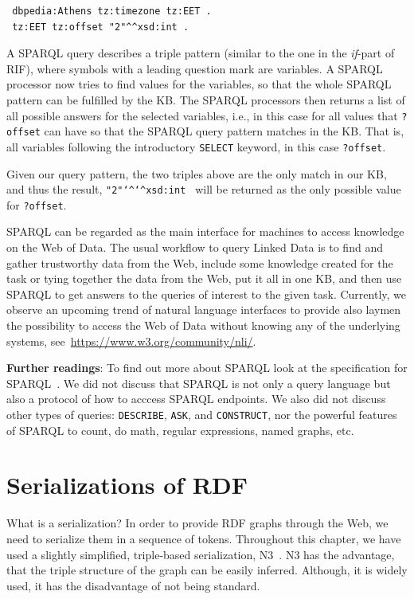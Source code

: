 \begin{verbatim}
 dbpedia:Athens tz:timezone tz:EET .
 tz:EET tz:offset "2"^^xsd:int .
\end{verbatim}

A SPARQL query describes a triple pattern (similar to the one in the \textit{if}-part of RIF),
where symbols with a leading question mark are variables.
A SPARQL processor now tries to find values for the variables, so that the whole SPARQL pattern can be fulfilled by the \ac{KB}.
The SPARQL processors then returns a list of all possible answers for the selected variables, i.e., in this case for all values that \texttt{?offset} can have so that the SPARQL query pattern matches in the \ac{KB}.
That is, all variables following the introductory \texttt{SELECT} keyword, in this case \texttt{?offset}.

Given our query pattern, the two triples above are the only match in our \ac{KB}, and thus the result, \texttt{"2"\texttt{\char`\^}\texttt{\char`\^}xsd:int } will be returned as the only possible value for \texttt{?offset}.

SPARQL can be regarded as the main interface for machines to access knowledge on the Web of Data.
The usual workflow to query Linked Data is to find and gather trustworthy data from the Web, include some knowledge created for the task or tying together the data from the Web, put it all in one \ac{KB}, and then use SPARQL to get answers to the queries of interest to the given task.
Currently, we observe an upcoming trend of natural language interfaces to provide also laymen the possibility to access the Web of Data without knowing any of the underlying systems, see~\url{https://www.w3.org/community/nli/}.

\medskip

\textbf{Further readings}:
To find out more about SPARQL look at the specification for SPARQL~\cite{Sparql11query}.
We did not discuss that SPARQL is not only a query language but also a protocol of how to acccess SPARQL endpoints.
We also did not discuss other types of queries: \texttt{DESCRIBE}, \texttt{ASK}, and \texttt{CONSTRUCT}, nor the powerful features of SPARQL to count, do math, regular expressions, named graphs, etc.

\section{Serializations of RDF}
\label{rdfa}
What is a serialization?
In order to provide \ac{RDF} graphs through the Web, we need to serialize them in a sequence of tokens.
Throughout this chapter, we have used a slightly simplified, triple-based serialization, N3~\cite{n3-tech}.
N3 has the advantage, that the triple structure of the graph can be easily inferred.
Although, it is widely used, it has the disadvantage of not being standard.

